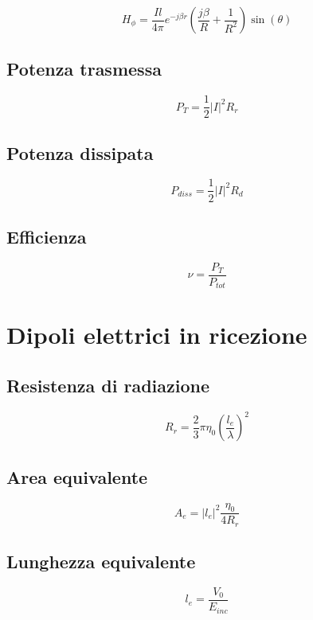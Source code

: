 \documentclass[10pt,a4paper]{report}
\begin{document}
		\begin{equation}
		H_{\phi}=\frac{Il}{4\pi}e^{-j\beta r}(\frac{j \beta}{R}+\frac{1}{R^2})\sin(\theta)
		\end{equation}

		\subsection{Potenza trasmessa}

	  \[
	  P_T=\frac{1}{2}|I|^2R_r
	  \]

	  	\subsection{Potenza dissipata}

	  \[
	  P_{diss}=\frac{1}{2}|I|^2R_d
	  \]

	  \subsection{Efficienza}

	  	\[
		\nu=\frac{P_{T}}{P_{tot}}
	  	\]


		\section{Dipoli elettrici in ricezione}

			\subsection{Resistenza di radiazione}			
				\begin{equation}
				R_r=\frac{2}{3}\pi\eta_0(\frac{l_e}{\lambda})^2
				\end{equation}

			\subsection{Area equivalente}			
				\begin{equation}
				A_e=|l_e|^2\frac{\eta_0}{4R_r}
				\end{equation}

			\subsection{Lunghezza equivalente}			
				\begin{equation}
				l_e=\frac{V_0}{E_{inc}}
				\label{eq:lunghezza-equivalente}
				\end{equation}
\end{document}
